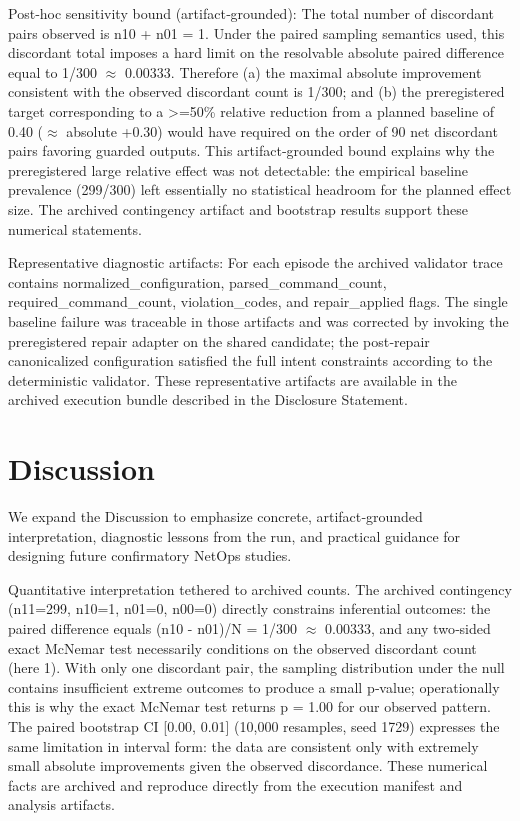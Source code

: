 \documentclass[conference]{IEEEtran}
\begin{document}
Post‑hoc sensitivity bound (artifact‑grounded): The total number of discordant pairs observed is n10 + n01 = 1. Under the paired sampling semantics used, this discordant total imposes a hard limit on the resolvable absolute paired difference equal to 1/300 \ensuremath{\approx} 0.00333. Therefore (a) the maximal absolute improvement consistent with the observed discordant count is 1/300; and (b) the preregistered target corresponding to a >=50\% relative reduction from a planned baseline of 0.40 (\ensuremath{\approx} absolute +0.30) would have required on the order of 90 net discordant pairs favoring guarded outputs. This artifact‑grounded bound explains why the preregistered large relative effect was not detectable: the empirical baseline prevalence (299/300) left essentially no statistical headroom for the planned effect size. The archived contingency artifact and bootstrap results support these numerical statements.

Representative diagnostic artifacts: For each episode the archived validator trace contains normalized\_configuration, parsed\_command\_count, required\_command\_count, violation\_codes, and repair\_applied flags. The single baseline failure was traceable in those artifacts and was corrected by invoking the preregistered repair adapter on the shared candidate; the post‑repair canonicalized configuration satisfied the full intent constraints according to the deterministic validator. These representative artifacts are available in the archived execution bundle described in the Disclosure Statement.

\section{Discussion}
We expand the Discussion to emphasize concrete, artifact‑grounded interpretation, diagnostic lessons from the run, and practical guidance for designing future confirmatory NetOps studies.

Quantitative interpretation tethered to archived counts. The archived contingency (n11=299, n10=1, n01=0, n00=0) directly constrains inferential outcomes: the paired difference equals (n10 - n01)/N = 1/300 \ensuremath{\approx} 0.00333, and any two‑sided exact McNemar test necessarily conditions on the observed discordant count (here 1). With only one discordant pair, the sampling distribution under the null contains insufficient extreme outcomes to produce a small p‑value; operationally this is why the exact McNemar test returns p = 1.00 for our observed pattern. The paired bootstrap CI [0.00, 0.01] (10,000 resamples, seed 1729) expresses the same limitation in interval form: the data are consistent only with extremely small absolute improvements given the observed discordance. These numerical facts are archived and reproduce directly from the execution manifest and analysis artifacts.
\end{document}
